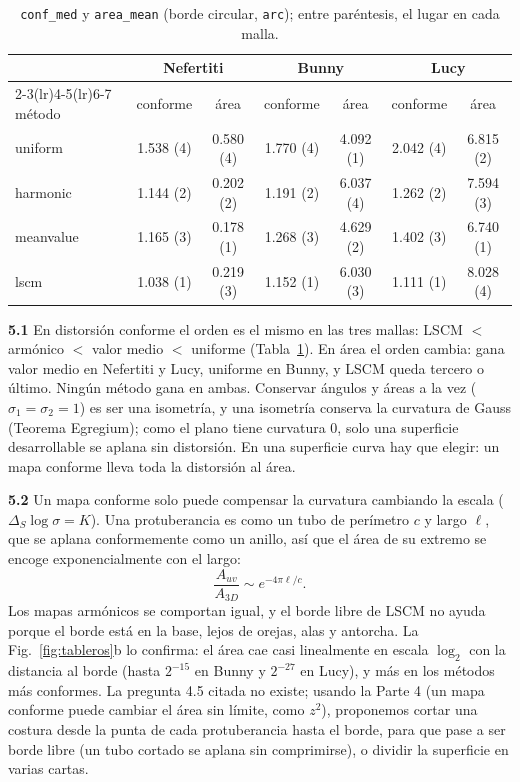 \documentclass[
	spanish, %
	a4paper, oneside
]{article}
\newcommand{\code}[1]{\texttt{#1}}
\newcommand{\preg}[1]{\textbf{#1}\enspace}
\begin{document}
\begin{table}[h]
\centering\small
\caption{\code{conf\_med} y \code{area\_mean} (borde circular, \code{arc}); entre paréntesis, el lugar en cada malla.}
\label{tab:orden}
\begin{tabular}{lcccccc}
\toprule
& \multicolumn{2}{c}{Nefertiti} & \multicolumn{2}{c}{Bunny} & \multicolumn{2}{c}{Lucy} \\
\cmidrule(lr){2-3}\cmidrule(lr){4-5}\cmidrule(lr){6-7}
método & conforme & área & conforme & área & conforme & área \\
\midrule
uniform & 1.538 (4) & 0.580 (4) & 1.770 (4) & 4.092 (1) & 2.042 (4) & 6.815 (2) \\
harmonic & 1.144 (2) & 0.202 (2) & 1.191 (2) & 6.037 (4) & 1.262 (2) & 7.594 (3) \\
meanvalue & 1.165 (3) & 0.178 (1) & 1.268 (3) & 4.629 (2) & 1.402 (3) & 6.740 (1) \\
lscm & 1.038 (1) & 0.219 (3) & 1.152 (1) & 6.030 (3) & 1.111 (1) & 8.028 (4) \\
\bottomrule
\end{tabular}
\end{table}

\preg{5.1} En distorsión conforme el orden es el mismo en las tres mallas: LSCM $<$ armónico $<$ valor medio $<$ uniforme (Tabla~\ref{tab:orden}). En área el orden cambia: gana valor medio en Nefertiti y Lucy, uniforme en Bunny, y LSCM queda tercero o último. Ningún método gana en ambas. Conservar ángulos y áreas a la vez ($\sigma_1=\sigma_2=1$) es ser una isometría, y una isometría conserva la curvatura de Gauss (Teorema Egregium); como el plano tiene curvatura 0, solo una superficie desarrollable se aplana sin distorsión. En una superficie curva hay que elegir: un mapa conforme lleva toda la distorsión al área.

\preg{5.2} Un mapa conforme solo puede compensar la curvatura cambiando la escala ($\Delta_S\log\sigma=K$). Una protuberancia es como un tubo de perímetro $c$ y largo $\ell$, que se aplana conformemente como un anillo, así que el área de su extremo se encoge exponencialmente con el largo:
\[
\frac{A_{uv}}{A_{3D}}\sim e^{-4\pi\ell/c}.
\]
Los mapas armónicos se comportan igual, y el borde libre de LSCM no ayuda porque el borde está en la base, lejos de orejas, alas y antorcha. La Fig.~\ref{fig:tableros}b lo confirma: el área cae casi linealmente en escala $\log_2$ con la distancia al borde (hasta $2^{-15}$ en Bunny y $2^{-27}$ en Lucy), y más en los métodos más conformes. La pregunta 4.5 citada no existe; usando la Parte 4 (un mapa conforme puede cambiar el área sin límite, como $z^2$), proponemos cortar una costura desde la punta de cada protuberancia hasta el borde, para que pase a ser borde libre (un tubo cortado se aplana sin comprimirse), o dividir la superficie en varias cartas.
\end{document}
